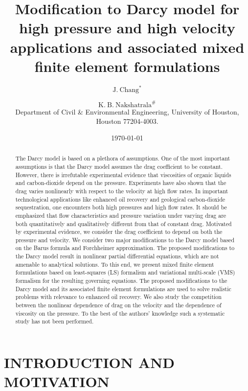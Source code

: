 \documentclass[11pt,reqno]{amsart}
\title{Modification to Darcy model for high pressure and 
high velocity applications and associated mixed finite 
element formulations}
\author{$\mathrm{J.~Chang}^{*}$} \thanks{*{\tiny Graduate student}}
\author{$\mathrm{K.~B.~Nakshatrala}^{\#}$ \\ 
{\tiny Department of Civil \& Environmental Engineering, 
University of Houston, Houston 77204-4003.}}
\date{\today}
\begin{document}
\maketitle

\vspace{-0.3in} 

\begin{abstract}
The Darcy model is based on a plethora of assumptions. One 
of the most important assumptions is that the Darcy model 
assumes the drag coefficient to be constant. However, 
there is irrefutable experimental evidence that viscosities 
of organic liquids and carbon-dioxide depend on the 
pressure. Experiments have also shown that the drag 
varies nonlinearly with respect to the velocity at 
high flow rates. In important technological applications 
like enhanced oil recovery and geological carbon-dioxide 
sequestration, one encounters both high pressures 
and high flow rates. It should be emphasized that 
flow characteristics and pressure variation under 
varying drag are both quantitatively and qualitatively 
different from that of constant drag. 
Motivated by experimental evidence, we consider the 
drag coefficient to depend on both the pressure and 
velocity. We consider two major modifications to the
Darcy model based on the Barus formula and Forchheimer 
approximation. The proposed modifications to the Darcy 
model result in nonlinear partial differential equations, 
which are not amenable to analytical solutions. To this 
end, we present mixed finite element formulations based 
on least-squares (LS) formalism and variational multi-scale 
(VMS) formalism for the resulting governing equations. The 
proposed modifications to the Darcy model and its associated 
finite element formulations are used to solve realistic 
problems with relevance to enhanced oil recovery. 
We also study the competition between the nonlinear 
dependence of drag on the velocity and the dependence 
of viscosity on the pressure. To the best of the authors' 
knowledge such a systematic study has not been 
performed. 
\end{abstract}



\section{INTRODUCTION AND MOTIVATION}
\label{Ch:Intro}
\end{document}
